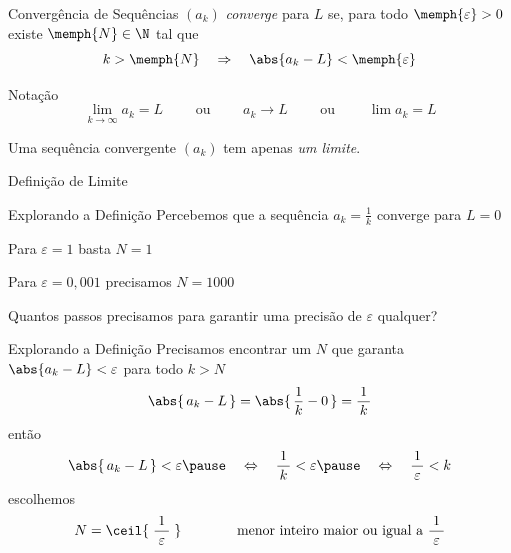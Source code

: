 \begin{frame}{Convergência de Sequências}
    $(a_k)$ \emph{converge} para $L$ se, para todo $\memph{\varepsilon}>0$
    existe $\memph{N}\in \N$ tal que
    \[
    	k>\memph{N} \quad \Rightarrow  \quad \abs{a_k-L}<\memph{\varepsilon}
    \]

    \pause
    \vspace{\baselineskip}
    Notação
    \[
      \lim_{k\to \infty} a_k = L \qquad\text{ ou }\qquad
      a_k \to L                  \qquad\text{ ou }\qquad
      \lim a_k = L
    \]

    \pause
    \vspace{\baselineskip}
    Uma sequência convergente $(a_k)$ tem apenas \emph{um limite}.
\end{frame}

\begin{frame}{Definição de Limite}
  \centering
  \scalebox{0.9}{}
\end{frame}

\begin{frame}{Explorando a Definição}
    Percebemos que a sequência \(a_k = \frac{1}{k}\) converge para $L = 0$

    \pause
    \vspace{\baselineskip}
    Para $\varepsilon=1$     \tabto{28mm} basta      \tabto{50mm} $N=1$

    \pause
    Para $\varepsilon=0,001$ \tabto{28mm} precisamos \tabto{50mm} $N=1000$

    \pause
    \vspace{\baselineskip}
    Quantos passos precisamos para garantir uma precisão de $\varepsilon$ qualquer?

\end{frame}

\begin{frame}{Explorando a Definição}
    Precisamos encontrar um $N$ que garanta
    \(\abs{a_k-L}<\varepsilon\)
    para todo $k>N$
    \pause
    \[\abs{\,a_k-L\,} = \abs{\,\frac{1}{k}-0\,} = \frac{1}{\,k\,} \]
    \pause
    então
    \[
        \abs{\,a_k-L\,}<\varepsilon
        \pause
        \quad\Leftrightarrow\quad
        \frac{1}{\,k\,} < \varepsilon
        \pause
        \quad\Leftrightarrow\quad
        \frac{1}{\,\varepsilon\,} < k
    \]
    \pause
    escolhemos
    \[
        N = \ceil{\;\frac{1}{\;\varepsilon\;}\;}
        \qquad\qquad\text{menor inteiro maior ou igual a } \frac{1}{\;\varepsilon\;}
    \]
\end{frame}

